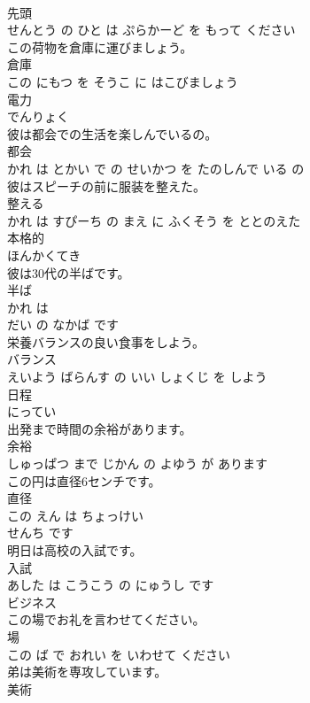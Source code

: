 \documentclass[8pt]{extreport}
\begin{document}
\begin{CJK}{UTF8}{min}
\\	先頭 
\\	せんとう の ひと は ぷらかーど を もって ください			
\\	この荷物を倉庫に運びましょう。	
\\	倉庫 
\\	この にもつ を そうこ に はこびましょう			
\\	電力	
\\	でんりょく		
\\	彼は都会での生活を楽しんでいるの。	
\\	都会 
\\	かれ は とかい で の せいかつ を たのしんで いる の			
\\	彼はスピーチの前に服装を整えた。	
\\	整える 
\\	かれ は すぴーち の まえ に ふくそう を ととのえた			
\\	本格的	
\\	ほんかくてき		
\\	彼は30代の半ばです。	
\\	半ば 
\\	かれ は 
\\	だい の なかば です			
\\	栄養バランスの良い食事をしよう。	
\\	バランス 
\\	えいよう ばらんす の いい しょくじ を しよう			
\\	日程	
\\	にってい		
\\	出発まで時間の余裕があります。	
\\	余裕 
\\	しゅっぱつ まで じかん の よゆう が あります			
\\	この円は直径6センチです。	
\\	直径 
\\	この えん は ちょっけい 
\\	せんち です			
\\	明日は高校の入試です。	
\\	入試 
\\	あした は こうこう の にゅうし です			
\\	ビジネス	
\\	この場でお礼を言わせてください。	
\\	場 
\\	この ば で おれい を いわせて ください			
\\	弟は美術を専攻しています。	
\\	美術 

\end{CJK}
\end{document}
